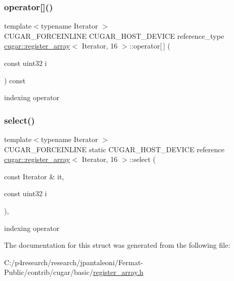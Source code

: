 \subsubsection{\texorpdfstring{operator[]()}{operator[]()}}
{\footnotesize\ttfamily template$<$typename Iterator $>$ \\
C\+U\+G\+A\+R\+\_\+\+F\+O\+R\+C\+E\+I\+N\+L\+I\+NE C\+U\+G\+A\+R\+\_\+\+H\+O\+S\+T\+\_\+\+D\+E\+V\+I\+CE reference\+\_\+type \hyperlink{structcugar_1_1register__array}{cugar\+::register\+\_\+array}$<$ Iterator, 16 $>$\+::operator\mbox{[}$\,$\mbox{]} (\begin{DoxyParamCaption}\item[{const uint32}]{i }\end{DoxyParamCaption}) const\hspace{0.3cm}{\ttfamily [inline]}}

indexing operator \mbox{\label{structcugar_1_1register__array_3_01_iterator_00_0116_01_4_a981a1254c3cbc07ec2274aa34e8c7693}} 
\subsubsection{\texorpdfstring{select()}{select()}}
{\footnotesize\ttfamily template$<$typename Iterator $>$ \\
C\+U\+G\+A\+R\+\_\+\+F\+O\+R\+C\+E\+I\+N\+L\+I\+NE static C\+U\+G\+A\+R\+\_\+\+H\+O\+S\+T\+\_\+\+D\+E\+V\+I\+CE reference \hyperlink{structcugar_1_1register__array}{cugar\+::register\+\_\+array}$<$ Iterator, 16 $>$\+::select (\begin{DoxyParamCaption}\item[{const Iterator \&}]{it,  }\item[{const uint32}]{i }\end{DoxyParamCaption})\hspace{0.3cm}{\ttfamily [inline]}, {\ttfamily [static]}}

indexing operator 

The documentation for this struct was generated from the following file\+:\begin{DoxyCompactItemize}
\item 
C\+:/p4research/research/jpantaleoni/\+Fermat-\/\+Public/contrib/cugar/basic/\hyperlink{register__array_8h}{register\+\_\+array.\+h}\end{DoxyCompactItemize}
